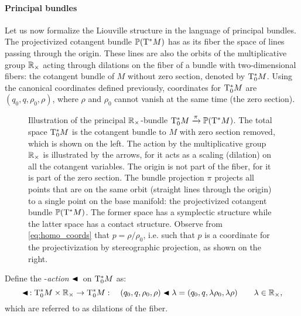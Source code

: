 \paragraph{Principal bundles}
Let us now formalize the Liouville structure in the language of principal bundles. The projectivized cotangent bundle $\mathbb{P}\qty(\mathrm{T}^*M)$ has as its fiber the space of lines passing through the origin. These lines are also the orbits of the multiplicative group $\mathbb{R}_{\times}$ acting through dilations on the fiber of a bundle with two-dimensional fibers: the cotangent bundle of $M$ without zero section, denoted by $\mathrm{T}^*_0M$. Using the canonical coordinates defined previously, coordinates for $\mathrm{T}^*_0M$ are $(q_0, q, \rho_0, \rho)$, where $\rho$ and $\rho_0$ cannot vanish at the same time (the zero section). 
\begin{figure}[h!]
    \centering
    
    \caption{Illustration of the principal $\mathbb{R}_{\times}$-bundle $\mathrm{T}^*_0M\xrightarrow[]{\pi}\mathbb{P}\qty(\mathrm{T}^*M)$. The total space $\mathrm{T}^*_0M$ is the cotangent bundle to $M$ with zero section removed, which is shown on the left. The action by the multiplicative group $\mathbb{R}_{\times}$ is illustrated by the arrows, for it acts as a scaling (dilation) on all the cotangent variables. The origin is not part of the fiber, for it is part of the zero section. The bundle projection $\pi$ projects all points that are on the same orbit (straight lines through the origin) to a single point on the base manifold: the projectivized cotangent bundle $\mathbb{P}\qty(\mathrm{T}^*M)$. The former space has a symplectic structure while the latter space has a contact structure. Observe from \cref{eq:homo_coords} that $p = \rho/\rho_0$, i.e. such that $p$ is a coordinate for the projectivization by stereographic projection, as shown on the right.}
    \label{fig:principal_bundle}
\end{figure}

Define the \mgroup-\emph{action} $\blacktriangleleft\,$ on $\mathrm{T}^*_0M$ as:
$$ \blacktriangleleft\,: \mathrm{T}^*_0M\times\mathbb{R}_{\times} \to \mathrm{T}^*_0M : \quad (q_0, q, \rho_0, \rho) \blacktriangleleft \lambda = (q_0, q, \lambda \rho_0, \lambda \rho ) \qquad \lambda \in \mathbb{R}_{\times},$$
which are referred to as dilations of the fiber.

